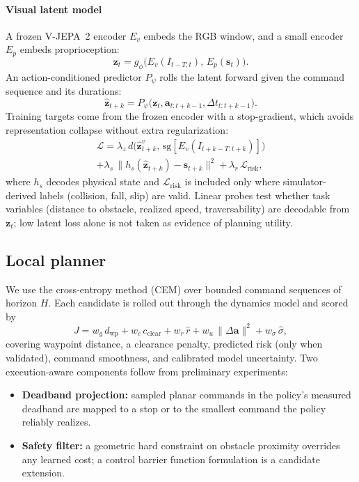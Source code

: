 \documentclass[conference]{IEEEtran}
\newcommand{\vect}[1]{\mathbf{#1}}
\begin{document}
\paragraph{Visual latent model}
A frozen V-JEPA~2 encoder $E_v$ \cite{assran2025vjepa2} embeds the RGB
window, and a small encoder $E_p$ embeds proprioception:
\begin{equation}
  \vect{z}_t = g_\phi\big(E_v(I_{t-T:t}),\, E_p(\vect{s}_t)\big).
\end{equation}
An action-conditioned predictor $P_\psi$ rolls the latent forward given
the command sequence and its durations:
\begin{equation}
  \hat{\vect{z}}_{t+k} = P_\psi\big(\vect{z}_t, \vect{a}_{t:t+k-1}, \Delta t_{t:t+k-1}\big).
\end{equation}
Training targets come from the frozen encoder with a stop-gradient,
which avoids representation collapse without extra regularization:
\begin{multline}
  \mathcal{L} = \lambda_z\, d\big(\hat{\vect{z}}^{v}_{t+k},\, \mathrm{sg}[E_v(I_{t+k-T:t+k})]\big) \\
  + \lambda_s\, \lVert h_s(\hat{\vect{z}}_{t+k}) - \vect{s}_{t+k} \rVert^2
  + \lambda_r\, \mathcal{L}_{\text{risk}},
\end{multline}
where $h_s$ decodes physical state and $\mathcal{L}_{\text{risk}}$ is
included only where simulator-derived labels (collision, fall, slip)
are valid. Linear probes test whether task variables (distance to
obstacle, realized speed, traversability) are decodable from
$\vect{z}_t$; low latent loss alone is not taken as evidence of
planning utility.

\subsection{Local planner}
We use the cross-entropy method (CEM) \cite{rubinstein1999cem} over
bounded command sequences of horizon $H$. Each candidate is rolled out
through the dynamics model and scored by
\begin{equation}
  J = w_g\, d_{\text{wp}} + w_c\, c_{\text{clear}} + w_r\, \hat{r}
    + w_u\, \lVert \Delta \vect{a} \rVert^2 + w_\sigma\, \hat{\sigma},
\end{equation}
covering waypoint distance, a clearance penalty, predicted risk (only
when validated), command smoothness, and calibrated model uncertainty.
Two execution-aware components follow from preliminary experiments:
\begin{itemize}
  \item \textbf{Deadband projection:} sampled planar commands in the
        policy's measured deadband are mapped to a stop or to the
        smallest command the policy reliably realizes.
  \item \textbf{Safety filter:} a geometric hard constraint on obstacle
        proximity overrides any learned cost; a control barrier function
        formulation \cite{ames2017cbf} is a candidate extension.
\end{itemize}
\end{document}
